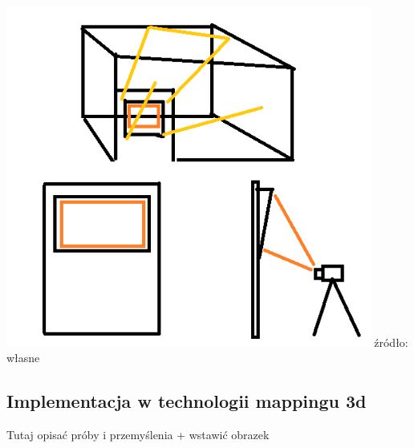 \begin{center}
\includegraphics[width=0.9\textwidth]{images/hologramv1.png}
\small {źródło: własne }
\end{center}

\subsection{Implementacja w technologii mappingu 3d}
{\color{red}Tutaj opisać próby i przemyślenia + wstawić obrazek}